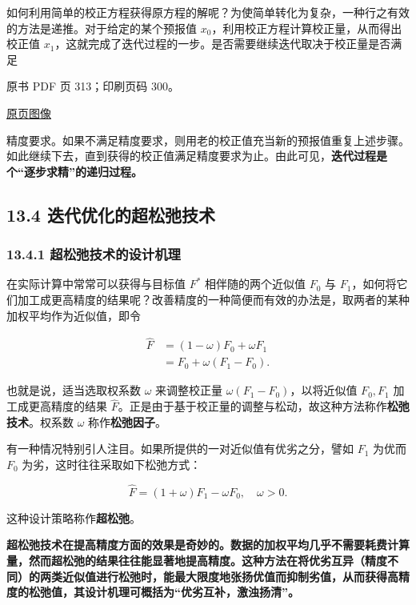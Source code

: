 如何利用简单的校正方程获得原方程的解呢？为使简单转化为复杂，一种行之有效的方法是递推。对于给定的某个预报值 \(x_0\)，利用校正方程计算校正量，从而得出校正值 \(x_1\)，这就完成了迭代过程的一步。是否需要继续迭代取决于校正量是否满足

\clearpage

原书 PDF 页 313；印刷页码 300。

\href{source-images/pdf-313.jpeg}{原页图像}

精度要求。如果不满足精度要求，则用老的校正值充当新的预报值重复上述步骤。如此继续下去，直到获得的校正值满足精度要求为止。由此可见，\textbf{迭代过程是个``逐步求精''的递归过程。}

\subsection{13.4 迭代优化的超松弛技术}\label{ch13-ux8fedux4ee3ux4f18ux5316ux7684ux8d85ux677eux5f1bux6280ux672f}

\subsubsection{13.4.1 超松弛技术的设计机理}\label{ch13-ux8d85ux677eux5f1bux6280ux672fux7684ux8bbeux8ba1ux673aux7406}

在实际计算中常常可以获得与目标值 \(F^*\) 相伴随的两个近似值 \(F_0\) 与 \(F_1\)，如何将它们加工成更高精度的结果呢？改善精度的一种简便而有效的办法是，取两者的某种加权平均作为近似值，即令

\[
\begin{aligned}
\widehat F&=(1-\omega)F_0+\omega F_1\\
&=F_0+\omega(F_1-F_0).
\end{aligned}
\]

也就是说，适当选取权系数 \(\omega\) 来调整校正量 \(\omega(F_1-F_0)\)，以将近似值 \(F_0,F_1\) 加工成更高精度的结果 \(\widehat F\)。正是由于基于校正量的调整与松动，故这种方法称作\textbf{松弛技术}。权系数 \(\omega\) 称作\textbf{松弛因子}。

有一种情况特别引人注目。如果所提供的一对近似值有优劣之分，譬如 \(F_1\) 为优而 \(F_0\) 为劣，这时往往采取如下松弛方式：

\[
\widehat F=(1+\omega)F_1-\omega F_0,\quad\omega>0.
\]

这种设计策略称作\textbf{超松弛}。

\textbf{超松弛技术在提高精度方面的效果是奇妙的。数据的加权平均几乎不需要耗费计算量，然而超松弛的结果往往能显著地提高精度。这种方法在将优劣互异（精度不同）的两类近似值进行松弛时，能最大限度地张扬优值而抑制劣值，从而获得高精度的松弛值，其设计机理可概括为``优劣互补，激浊扬清''。}

